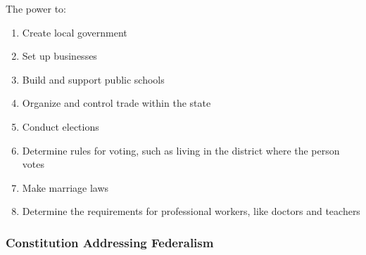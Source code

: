 \begin{definition}
    The power to:
    
    \begin{enumerate}
        \item Create local government
        \item Set up businesses
        \item Build and support public schools
        \item Organize and control trade within the state
        \item Conduct elections
        \item Determine rules for voting, such as living in the district where the person votes
        \item Make marriage laws
        \item Determine the requirements for professional workers, like doctors and teachers
    \end{enumerate}
\end{definition}

\subsubsection*{Constitution Addressing Federalism}

\newpage
